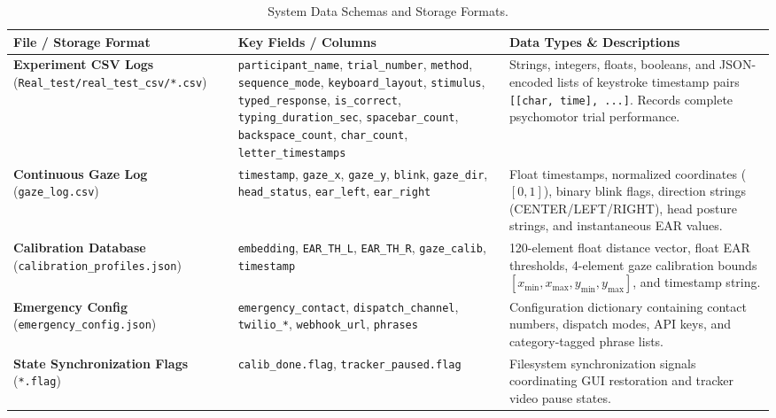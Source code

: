 \documentclass[11pt,a4paper]{article}
\begin{document}
\begin{table}[H]
\centering
\caption{System Data Schemas and Storage Formats.}
\label{tab:schemas}
\small
\begin{tabularx}{\textwidth}{p{} p{} X}
\toprule
\textbf{File / Storage Format} & \textbf{Key Fields / Columns} & \textbf{Data Types \& Descriptions} \\
\midrule
\textbf{Experiment CSV Logs} \newline (\texttt{Real\_test/real\_test\_csv/*.csv}) & \texttt{participant\_name}, \texttt{trial\_number}, \texttt{method}, \texttt{sequence\_mode}, \texttt{keyboard\_layout}, \texttt{stimulus}, \texttt{typed\_response}, \texttt{is\_correct}, \texttt{typing\_duration\_sec}, \texttt{spacebar\_count}, \texttt{backspace\_count}, \texttt{char\_count}, \texttt{letter\_timestamps} & Strings, integers, floats, booleans, and JSON-encoded lists of keystroke timestamp pairs \texttt{[[char, time], ...]}. Records complete psychomotor trial performance. \\
\midrule
\textbf{Continuous Gaze Log} \newline (\texttt{gaze\_log.csv}) & \texttt{timestamp}, \texttt{gaze\_x}, \texttt{gaze\_y}, \texttt{blink}, \texttt{gaze\_dir}, \texttt{head\_status}, \texttt{ear\_left}, \texttt{ear\_right} & Float timestamps, normalized coordinates ($[0, 1]$), binary blink flags, direction strings (CENTER/LEFT/RIGHT), head posture strings, and instantaneous EAR values. \\
\midrule
\textbf{Calibration Database} \newline (\texttt{calibration\_profiles.json}) & \texttt{embedding}, \texttt{EAR\_TH\_L}, \texttt{EAR\_TH\_R}, \texttt{gaze\_calib}, \texttt{timestamp} & 120-element float distance vector, float EAR thresholds, 4-element gaze calibration bounds $[x_{\min}, x_{\max}, y_{\min}, y_{\max}]$, and timestamp string. \\
\midrule
\textbf{Emergency Config} \newline (\texttt{emergency\_config.json}) & \texttt{emergency\_contact}, \texttt{dispatch\_channel}, \texttt{twilio\_*}, \texttt{webhook\_url}, \texttt{phrases} & Configuration dictionary containing contact numbers, dispatch modes, API keys, and category-tagged phrase lists. \\
\midrule
\textbf{State Synchronization Flags} \newline (\texttt{*.flag}) & \texttt{calib\_done.flag}, \texttt{tracker\_paused.flag} & Filesystem synchronization signals coordinating GUI restoration and tracker video pause states. \\
\bottomrule
\end{tabularx}
\end{table}
\end{document}

